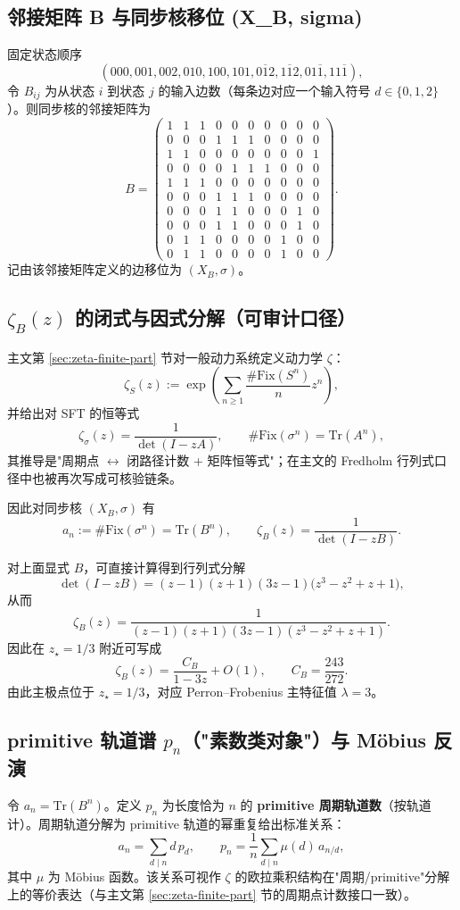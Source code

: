 \subsection{邻接矩阵 B 与同步核移位 (X\_B, sigma)}\label{app:sync-kernel-basic}
固定状态顺序
\[
(000,001,002,010,100,101,0\overline{1}2,1\overline{1}2,01\overline{1},11\overline{1}),
\]
令 $B_{ij}$ 为从状态 $i$ 到状态 $j$ 的输入边数（每条边对应一个输入符号 $d\in\{0,1,2\}$）。则同步核的邻接矩阵为
\[
B=
\begin{pmatrix}
1&1&1&0&0&0&0&0&0&0\\
0&0&0&1&1&1&0&0&0&0\\
1&1&0&0&0&0&0&0&0&1\\
0&0&0&0&1&1&1&0&0&0\\
1&1&1&0&0&0&0&0&0&0\\
0&0&0&1&1&1&0&0&0&0\\
0&0&0&1&1&0&0&0&1&0\\
0&0&0&1&1&0&0&0&1&0\\
0&1&1&0&0&0&0&1&0&0\\
0&1&1&0&0&0&0&1&0&0
\end{pmatrix}.
\]
记由该邻接矩阵定义的边移位为 $(X_B,\sigma)$。

\subsection{\texorpdfstring{$\zeta_B(z)$}{zeta\_B(z)} 的闭式与因式分解（可审计口径）}
主文第 \ref{sec:zeta-finite-part} 节对一般动力系统定义动力学 $\zeta$：
\[
\zeta_S(z):=\exp\!\left(\sum_{n\ge 1}\frac{\#\mathrm{Fix}(S^n)}{n}z^n\right),
\]
并给出对 SFT 的恒等式
\[
\zeta_\sigma(z)=\frac{1}{\det(I-zA)},\qquad
\#\mathrm{Fix}(\sigma^n)=\mathrm{Tr}(A^n),
\]
其推导是"周期点 $\leftrightarrow$ 闭路径计数 + 矩阵恒等式"；在主文的 Fredholm 行列式口径中也被再次写成可核验链条。

因此对同步核 $(X_B,\sigma)$ 有
\[
a_n:=\#\mathrm{Fix}(\sigma^n)=\mathrm{Tr}(B^n),\qquad
\zeta_B(z)=\frac{1}{\det(I-zB)}.
\]

对上面显式 $B$，可直接计算得到行列式分解
\[
\det(I-zB)=(z-1)(z+1)(3z-1)\bigl(z^3-z^2+z+1\bigr),
\]
从而
\[
\zeta_B(z)=\frac{1}{(z-1)(z+1)(3z-1)(z^3-z^2+z+1)}.
\]
因此在 $z_\star=1/3$ 附近可写成
\[
\zeta_B(z)=\frac{C_B}{1-3z}+O(1),
\qquad
C_B=\frac{243}{272}.
\]
由此主极点位于 $z_\star=1/3$，对应 Perron--Frobenius 主特征值 $\lambda=3$。

\subsection{primitive 轨道谱 \texorpdfstring{$p_n$}{p\_n}（"素数类对象"）与 Möbius 反演}
令 $a_n=\mathrm{Tr}(B^n)$。定义 $p_n$ 为长度恰为 $n$ 的 \textbf{primitive 周期轨道数}（按轨道计）。周期轨道分解为 primitive 轨道的幂重复给出标准关系：
\[
a_n=\sum_{d\mid n} d\,p_d,
\qquad
p_n=\frac{1}{n}\sum_{d\mid n}\mu(d)\,a_{n/d},
\]
其中 $\mu$ 为 Möbius 函数。该关系可视作 $\zeta$ 的欧拉乘积结构在"周期/primitive"分解上的等价表达（与主文第 \ref{sec:zeta-finite-part} 节的周期点计数接口一致）。

